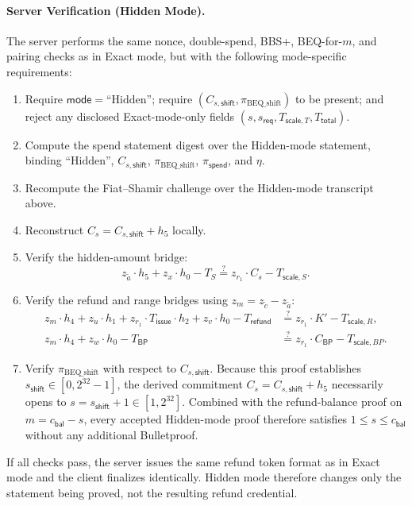 \documentclass[11pt]{article}
\theoremstyle{definitionstyle}
\theoremstyle{plain}
\begin{document}
\paragraph{Server Verification (Hidden Mode).}
The server performs the same nonce, double-spend, BBS+, BEQ-for-$m$, and pairing checks as in Exact mode, but with the following mode-specific requirements:
\begin{enumerate}[leftmargin=*]
\item Require $\mathsf{mode} = \text{``Hidden''}$; require $(C_{s,\mathsf{shift}}, \pi_{\text{BEQ\_shift}})$ to be present; and reject any disclosed Exact-mode-only fields $(s, s_{\mathsf{req}}, T_{\mathsf{scale},T}, T_{\mathsf{total}})$.
\item Compute the spend statement digest over the Hidden-mode statement, binding $\text{``Hidden''}$, $C_{s,\mathsf{shift}}$, $\pi_{\text{BEQ\_shift}}$, $\pi_{\mathsf{spend}}$, and $\eta$.
\item Recompute the Fiat--Shamir challenge over the Hidden-mode transcript above.
\item Reconstruct $C_s = C_{s,\mathsf{shift}} + h_5$ locally.
\item Verify the hidden-amount bridge:
  \[
  z_{\widetilde{a}} \cdot h_5 + z_x \cdot h_0 - T_S \stackrel{?}{=} z_{r_1} \cdot C_s - T_{\mathsf{scale},S}.
  \]
\item Verify the refund and range bridges using $z_m = z_{\tilde{c}} - z_{\widetilde{a}}$:
  \begin{align*}
    z_m \cdot h_4 + z_u \cdot h_1 + z_{r_1} \cdot T_{\mathsf{issue}} \cdot h_2 + z_v \cdot h_0 - T_{\mathsf{refund}} &\stackrel{?}{=} z_{r_1} \cdot K' - T_{\mathsf{scale},R}, \\
    z_m \cdot h_4 + z_w \cdot h_0 - T_{\mathsf{BP}} &\stackrel{?}{=} z_{r_1} \cdot C_{\mathsf{BP}} - T_{\mathsf{scale},BP}.
  \end{align*}
\item Verify $\pi_{\text{BEQ\_shift}}$ with respect to $C_{s,\mathsf{shift}}$. Because this proof establishes $s_{\mathsf{shift}} \in [0,2^{32}-1]$, the derived commitment $C_s = C_{s,\mathsf{shift}} + h_5$ necessarily opens to $s = s_{\mathsf{shift}}+1 \in [1,2^{32}]$. Combined with the refund-balance proof on $m = c_{\mathsf{bal}} - s$, every accepted Hidden-mode proof therefore satisfies $1 \le s \le c_{\mathsf{bal}}$ without any additional Bulletproof.
\end{enumerate}
If all checks pass, the server issues the same refund token format as in Exact mode and the client finalizes identically. Hidden mode therefore changes only the statement being proved, not the resulting refund credential.
\end{document}

